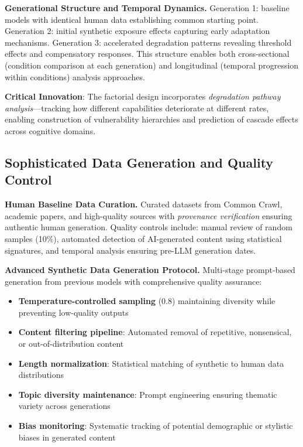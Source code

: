 \documentclass{article}
\begin{document}
\textbf{Generational Structure and Temporal Dynamics.} Generation 1: baseline models with identical human data establishing common starting point. Generation 2: initial synthetic exposure effects capturing early adaptation mechanisms. Generation 3: accelerated degradation patterns revealing threshold effects and compensatory responses. This structure enables both cross-sectional (condition comparison at each generation) and longitudinal (temporal progression within conditions) analysis approaches.

\textbf{Critical Innovation}: The factorial design incorporates \textit{degradation pathway analysis}—tracking how different capabilities deteriorate at different rates, enabling construction of vulnerability hierarchies and prediction of cascade effects across cognitive domains.

\subsection{Sophisticated Data Generation and Quality Control}

\textbf{Human Baseline Data Curation.} Curated datasets from Common Crawl, academic papers, and high-quality sources with \textit{provenance verification} ensuring authentic human generation. Quality controls include: manual review of random samples (10\%), automated detection of AI-generated content using statistical signatures, and temporal analysis ensuring pre-LLM generation dates.

\textbf{Advanced Synthetic Data Generation Protocol.} Multi-stage prompt-based generation from previous models with comprehensive quality assurance:
\begin{itemize}
\item \textbf{Temperature-controlled sampling} (0.8) maintaining diversity while preventing low-quality outputs
\item \textbf{Content filtering pipeline}: Automated removal of repetitive, nonsensical, or out-of-distribution content
\item \textbf{Length normalization}: Statistical matching of synthetic to human data distributions
\item \textbf{Topic diversity maintenance}: Prompt engineering ensuring thematic variety across generations
\item \textbf{Bias monitoring}: Systematic tracking of potential demographic or stylistic biases in generated content
\end{itemize}
\end{document}
